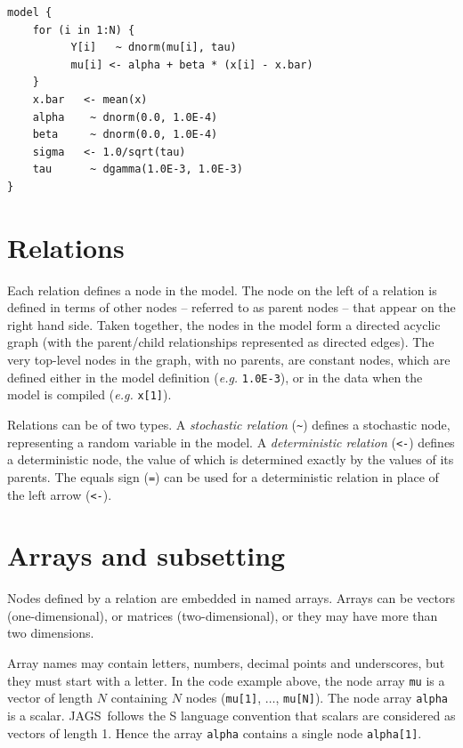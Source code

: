 \documentclass[11pt, a4paper, titlepage]{report}
\newcommand{\JAGS}{\textsf{JAGS}}
\begin{document}
\begin{verbatim}
model {
    for (i in 1:N) {
          Y[i]   ~ dnorm(mu[i], tau)
          mu[i] <- alpha + beta * (x[i] - x.bar)
    }
    x.bar   <- mean(x)
    alpha    ~ dnorm(0.0, 1.0E-4)
    beta     ~ dnorm(0.0, 1.0E-4)
    sigma   <- 1.0/sqrt(tau)
    tau      ~ dgamma(1.0E-3, 1.0E-3)
}
\end{verbatim}


\section{Relations}

Each relation defines a node in the model. The node on the left of a
relation is defined in terms of other nodes -- referred to as parent
nodes -- that appear on the right hand side. Taken together, the nodes
in the model form a directed acyclic graph (with the parent/child
relationships represented as directed edges). The very top-level
nodes in the graph, with no parents, are constant nodes, which are
defined either in the model definition ({\em e.g.}  \verb+1.0E-3+), or
in the data when the model is compiled ({\em e.g.}  \verb+x[1]+).

Relations can be of two types. A {\em stochastic relation} (\verb+~+)
defines a stochastic node, representing a random variable in the
model. A {\em deterministic relation} (\verb+<-+) defines a
deterministic node, the value of which is determined exactly by the
values of its parents. The equals sign (\verb+=+) can be used
for a deterministic relation in place of the left arrow (\verb+<-+).

\section{Arrays and subsetting}

Nodes defined by a relation are embedded in named arrays. Arrays can
be vectors (one-dimensional), or matrices (two-dimensional), or they
may have more than two dimensions.

Array names may contain letters, numbers, decimal points and
underscores, but they must start with a letter.  In the code example
above, the node array \verb+mu+ is a vector of length $N$ containing
$N$ nodes (\verb+mu[1]+, $\ldots$, \verb+mu[N]+). The node array
\verb+alpha+ is a scalar.  \JAGS\ follows the S language convention
that scalars are considered as vectors of length 1. Hence the array
\verb+alpha+ contains a single node \verb+alpha[1]+.
\end{document}
